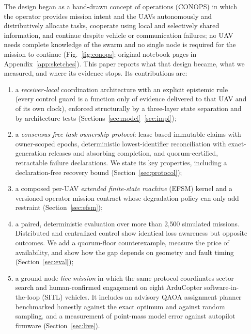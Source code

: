 \documentclass[conference]{IEEEtran}
\begin{document}
The design began as a hand-drawn concept of operations (CONOPS) in which the
operator provides mission intent and the UAVs autonomously and distributively
allocate tasks, cooperate using local and selectively shared information, and
continue despite vehicle or communication failures; no UAV needs complete
knowledge of the swarm and no single node is required for the mission to
continue (Fig.~\ref{fig:conops}; original notebook pages in
Appendix~\ref{app:sketches}). This paper reports what that design became,
what we measured, and where its evidence stops. Its contributions are:
\begin{enumerate}
  \item a \emph{receiver-local} coordination architecture with an explicit
  epistemic rule (every control guard is a function only of evidence
  delivered to that UAV and of its own clock), enforced structurally by a
  three-layer state separation and by architecture tests
  (Sections~\ref{sec:model}--\ref{sec:impl});
  \item a \emph{consensus-free task-ownership protocol}: lease-based
  immutable claims with owner-scoped epochs, deterministic
  lowest-identifier reconciliation with exact-generation releases and
  absorbing completion, and quorum-certified, retractable failure
  declarations. We state its key properties, including a
  declaration-free recovery bound (Section~\ref{sec:protocol});
  \item a composed per-UAV \emph{extended finite-state machine} (EFSM)
  kernel and a versioned operator mission contract whose degradation policy
  can only add restraint (Section~\ref{sec:efsm});
  \item a paired, deterministic evaluation over more than 2,500 simulated
  missions. Distributed and centralized control show identical loss awareness
  but opposite outcomes. We add a quorum-floor counterexample, measure the
  price of availability, and show how the gap depends on geometry and fault
  timing (Section~\ref{sec:eval});
  \item a ground-node \emph{live mission} in which the same protocol
  coordinates sector search and human-confirmed engagement on eight
  ArduCopter software-in-the-loop (SITL) vehicles. It includes an advisory
  QAOA assignment planner benchmarked honestly against the exact optimum and
  against random sampling, and a measurement of point-mass model error
  against autopilot firmware (Section~\ref{sec:live}).
\end{enumerate}
\end{document}
